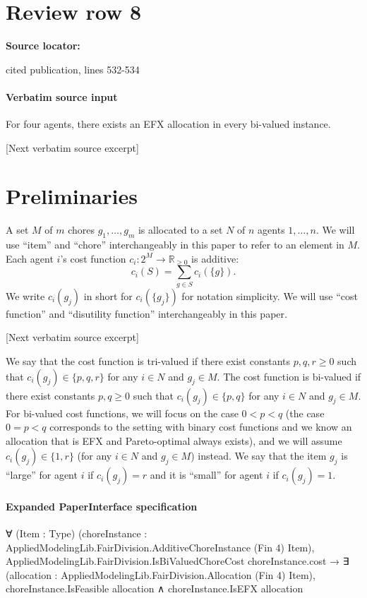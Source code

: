 \documentclass[10pt]{article}
\begin{document}
\section*{Review row 8}
\textbf{Source locator:} {\footnotesize\raggedright cited publication, lines 532-\allowbreak{}534\par}
\paragraph{Verbatim source input}
\begin{ReviewVerbatim}
\begin{theorem}\label{thm:four}
    For four agents, there exists an EFX allocation in every bi-valued instance.
\end{theorem}

[Next verbatim source excerpt]

\section{Preliminaries}
A set $M$ of $m$ chores $g_1,\ldots,g_m$ is allocated to a set $N$ of $n$ agents $1,\ldots,n$.
We will use ``item'' and ``chore'' interchangeably in this paper to refer to an element in $M$.
Each agent $i$'s cost function $c_i:2^M\to\mathbb{R}_{\geq0}$ is additive:
$$c_i(S)=\sum_{g\in S}c_i(\{g\}).$$
We write $c_i(g_j)$ in short for $c_i(\{g_j\})$ for notation simplicity.
We will use ``cost function'' and ``disutility function'' interchangeably in this paper.

[Next verbatim source excerpt]

We say that the cost function is tri-valued if there exist constants $p,q,r\geq 0$ such that $c_i(g_j)\in\{p,q,r\}$ for any $i\in N$ and $g_j\in M$.
The cost function is bi-valued if there exist constants $p,q\geq 0$ such that $c_i(g_j)\in\{p,q\}$ for any $i\in N$ and $g_j\in M$.
For bi-valued cost functions, we will focus on the case $0<p<q$ (the case $0=p<q$ corresponds to the setting with binary cost functions and we know an allocation that is EFX and Pareto-optimal always exists), and we will assume $c_i(g_j)\in\{1,r\}$ (for any $i\in N$ and $g_j\in M$) instead.
We say that the item $g_j$ is ``large'' for agent $i$ if $c_i(g_j)=r$ and it is ``small'' for agent $i$ if $c_i(g_j)=1$.
\end{ReviewVerbatim}



\paragraph{Expanded PaperInterface specification}
\begin{ReviewVerbatim}
∀ (Item : Type) (choreInstance : AppliedModelingLib.FairDivision.AdditiveChoreInstance (Fin 4) Item),
  AppliedModelingLib.FairDivision.IsBiValuedChoreCost choreInstance.cost →
    ∃ (allocation : AppliedModelingLib.FairDivision.Allocation (Fin 4) Item),
      choreInstance.IsFeasible allocation ∧ choreInstance.IsEFX allocation
\end{ReviewVerbatim}
\end{document}
